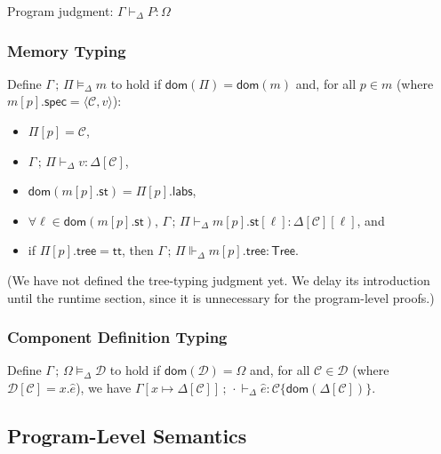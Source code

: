 \documentclass{article}
\newcommand{\mf}[1]{\mathsf{#1}}
\newcommand{\mc}[1]{\mathcal{#1}}
\newcommand{\semi}{\,;\,}
\newcommand{\dom}{\mf{dom}}
\newcommand{\pair}[2]{\langle #1, #2 \rangle}
\newcommand{\ptp}{A}
\newcommand{\tval}[4]{#1 \semi #2 \vdash_\Delta #3 : #4}
\newcommand{\texp}[5]{#1 \semi #2 \vdash_\Delta #3 : #4 \mid #5}
\newcommand{\tbod}[5]{#1 \semi #2 \vdash_\Delta #3 : #4\{#5\}}
\newcommand{\tprog}[3]{#1 \vdash_\Delta #2: #3}
\newcommand{\tmem}[3]{#1 \semi #2 \vDash_\Delta #3}
\newcommand{\tdef}[3]{#1 \semi #2 \vDash_\Delta #3}
\newcommand{\trhos}[4]{#1 \semi #2 \Vdash_\Delta #3 : #4}
\newcommand{\tview}{\mf{View}}
\newcommand{\ttree}{\mf{Tree}}
\renewcommand{\tt}{\mf{tt}}
\newcommand{\C}{\mc{C}}
\newcommand{\D}{\mc{D}}
\newcommand{\elet}[3]{\mf{let}\ #1 = #2\ \mf{in}\ #3}
\begin{document}
Program judgment: $\tprog{\Gamma}{P}{\Omega}$

\subsubsection{Memory Typing}

Define $\tmem{\Gamma}{\Pi}{m}$ to hold if $\dom(\Pi) = \dom(m)$
and, for all $p \in m$ (where $m[p].\mf{spec} = \pair{\C}{v}$):
\begin{itemize}
\item $\Pi[p] = \C$,
\item $\tval{\Gamma}{\Pi}{v}{\Delta[\C]}$,
\item $\dom(m[p].\mf{st}) = \Pi[p].\mf{labs}$,
\item $\forall \ell \in \dom(m[p].\mf{st})$,
$\tval{\Gamma}{\Pi}{m[p].\mf{st}[\ell]}{\Delta[\C][\ell]}$, and
\item if $\Pi[p].\mf{tree} = \tt$, then 
$\trhos{\Gamma}{\Pi}{m[p].\mf{tree}}{\ttree}$.
\end{itemize}

(We have not defined the tree-typing judgment yet.
We delay its introduction until the runtime section,
since it is unnecessary for the program-level proofs.)

\subsubsection{Component Definition Typing}

Define $\tdef{\Gamma}{\Omega}{\D}$ to hold if $\dom(\D)=\Omega$ and,
for all $\C \in \D$ (where $\D[\C] = x.\hat{e}$),
we have $\tbod{\Gamma[x \mapsto \Delta[\C]]}{\cdot}{\hat{e}}{\C}{\dom(\Delta[\C])}$.

\subsection{Program-Level Semantics}
\end{document}
